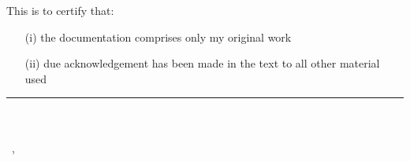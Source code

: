 \titlePage

\thispagestyle{empty}
This is to certify that:
\begin{itemize}
\item[(i)] the documentation comprises only my original work
\item[(ii)] due acknowledgement has been made in the text to all other material used
\end{itemize}

\vspace{2cm}
\begin{flushright}
\rule[0mm]{6cm}{0.2mm}\\
\authorOfThesis\\
\submissionDay~\submissionMonth,~\submissionYear\\
\end{flushright}
\clearpage
